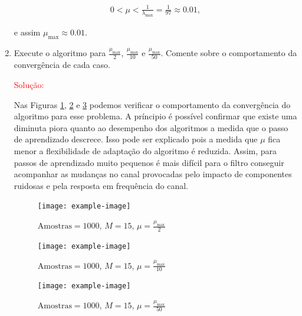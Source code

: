 \begin{enumerate}
        \begin{align}
            0 < \mu < \frac{1}{\lambda_{\text{max}}} = \frac{1}{97} \approx 0.01,
        \end{align}

        e assim $\mu_{\text{max}} \approx 0.01$.

    \item Execute o algoritmo para $\frac{\mu_{\text{max}}}{2}$, $\frac{\mu_{\text{max}}}{10}$ e $\frac{\mu_{\text{max}}}{50}$. Comente sobre o comportamento da convergência de cada caso.

        \textcolor{red}{Solução:}


        Nas Figuras \ref{fig:mu_2}, \ref{fig:mu_10} e \ref{fig:mu_50} podemos verificar o comportamento da convergência do algoritmo para esse problema. A príncipio é possível 
        confirmar que existe uma diminuta piora quanto ao desempenho dos algoritmos a medida que o passo de aprendizado descrece. Isso pode ser explicado pois a medida que 
        $\mu$ fica menor a flexibilidade de adaptação do algoritmo é reduzida. Assim, para passos de aprendizado muito pequenos é mais difícil para o filtro conseguir acompanhar
        as mudanças no canal provocadas pelo impacto de componentes ruidosas e pela resposta em frequência do canal. 

        \begin{figure}[!htp]
            \centering
            \texttt{[image: example-image]}
            \caption{$\text{Amostras} = 1000$, $M = 15$, $\mu = \frac{\mu_{\text{max}}}{2}$}
            \label{fig:mu_2}
        \end{figure}
    
        \begin{figure}[!htp]
            \centering
            \texttt{[image: example-image]}
            \caption{$\text{Amostras} = 1000$, $M = 15$, $\mu = \frac{\mu_{\text{max}}}{10}$}
            \label{fig:mu_10}
        \end{figure}
    
        \begin{figure}[!htp]
            \centering
            \texttt{[image: example-image]}
            \caption{$\text{Amostras} = 1000$, $M = 15$, $\mu = \frac{\mu_{\text{max}}}{50}$}
            \label{fig:mu_50}
        \end{figure}
        

\end{enumerate}
